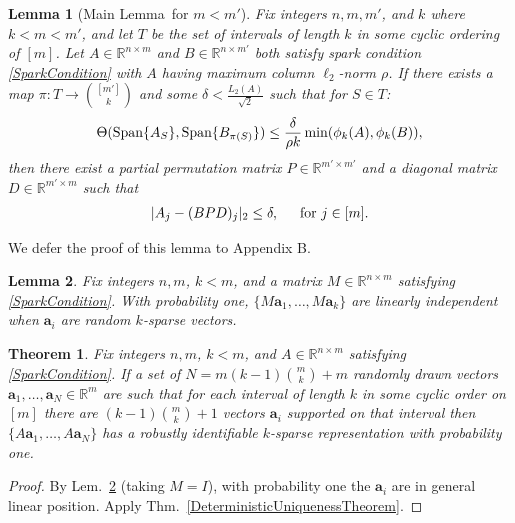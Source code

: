 \documentclass[journal, twocolumn]{IEEEtran}
\newtheorem{theorem}{Theorem}
\newtheorem{lemma}{Lemma}
\begin{document}
\begin{lemma}[Main Lemma~for $m < m'$]\label{MainLemma2}
Fix integers $n, m, m'$, and $k$ where $k < m < m'$, and let $T$ be the set of intervals of length $k$ in some cyclic ordering of $[m]$. Let $A \in \mathbb{R}^{n \times m}$ and $B \in \mathbb{R}^{n \times m'}$ both satisfy spark condition \eqref{SparkCondition} with $A$ having maximum column $\ell_2$-norm $\rho$. If there exists a map $\pi: T \to {[m'] \choose k}$ and some $\delta < \frac{L_{2}(A)}{\sqrt{2}}$ such that for $S \in T$:
\begin{equation}\label{GapUpperBound2}
\Theta(\text{\rm Span}\{A_{S}\}, \text{\rm Span}\{B_{\pi(S)}\}) \leq \frac{ \delta }{\rho k} \min(\phi_k(A), \phi_k(B)),
\end{equation}
then there exist a partial permutation matrix $P \in \mathbb{R}^{m' \times m'}$ and a diagonal matrix $D \in \mathbb{R}^{m' \times m}$ such that
\begin{align}
|A_j - (BPD)_j|_2 \leq \delta, \indent \text{for } j \in [m].
\end{align}
\end{lemma}

We defer the proof of this lemma to Appendix B.


\begin{lemma}\label{Hillar15lemma2}
Fix integers $n, m$, $k < m$, and a matrix $M \in \mathbb{R}^{n \times m}$ satisfying \eqref{SparkCondition}. With probability one, $\{M\mathbf{a}_1, \ldots, M\mathbf{a}_k\}$ are linearly independent when $\mathbf{a}_i$ are random $k$-sparse vectors.
\end{lemma}

\begin{theorem}\label{Theorem2}
Fix integers $n, m$, $k < m$, and $A \in \mathbb{R}^{n \times m}$ satisfying \eqref{SparkCondition}. If a set of $N = m(k-1){m \choose k}+m$ randomly drawn vectors $\mathbf{a}_1, \ldots, \mathbf{a}_N \in \mathbb{R}^m$ are such that for each interval of length $k$ in some cyclic order on $[m]$ there are $(k-1){m \choose k} + 1$ vectors $\mathbf{a}_i$ supported on that interval then $\{A\mathbf{a}_1, \ldots, A\mathbf{a}_N\}$ has a robustly identifiable $k$-sparse representation with probability one.
\end{theorem}

\begin{proof}
By Lem.~\ref{Hillar15lemma2} (taking $M = I$), with probability one the $\mathbf{a}_i$ are in general linear position. Apply Thm.~\ref{DeterministicUniquenessTheorem}.
\end{proof} 
\end{document}
